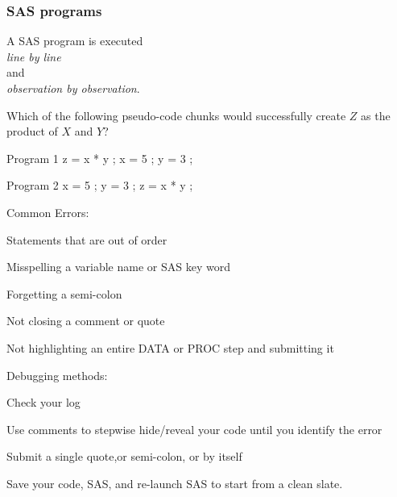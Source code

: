 \begin{frame}[fragile]
\frametitle{SAS programs}
\begin{center}
A SAS program is executed \\
\vskip5pt
\emph{line by line} \\
\vskip5pt
and \\
\vskip5pt
\emph{observation by observation}.\\
\end{center}
\begin{clicker}{Which of the following pseudo-code chunks would successfully create $Z$ as the product of $X$ and $Y$?}
\hspace{1in}
\emp
{}
\begin{craw}{.0}{Program 1}
z =  x * y ;
x = 5 ;
y = 3 ;
\end{craw}
\emp
{}
\hspace{1in}
\emp
{}
\begin{craw}{.0}{Program 2}
x = 5 ;
y = 3 ;
z =  x * y ;
\end{craw}
\emp
\end{clicker}
\end{frame}


\begin{frame}
Common Errors:
\bi
\item Statements that are out of order
\item Misspelling a variable name or SAS key word
\item Forgetting a semi-colon
\item Not closing a comment or quote
\item Not highlighting an entire DATA or PROC step and submitting it
\item[]
\ei
Debugging methods:
\bi
\item Check your log
\item Use comments to stepwise hide/reveal your code until you identify the error
\item Submit a single quote,or semi-colon, or  by itself
\item Save your code,  SAS, and re-launch SAS to start from a clean slate.
\ei
\end{frame}

